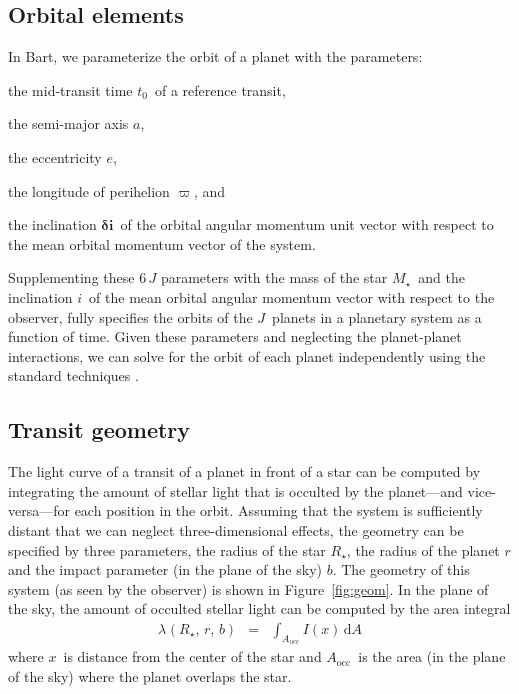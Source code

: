 \documentclass[12pt,preprint]{aastex}
\newcommand{\project}[1]{{\sffamily #1}}
\newcommand{\bart}{\project{Bart}}
\newcommand{\Fig}[1]{Figure~\ref{fig:#1}}
\newcommand{\fig}[1]{\Fig{#1}}
\newcommand{\eqlabel}[1]{\label{eq:#1}}
\newcommand{\dd}{\ensuremath{\,\mathrm{d}}}
\newcommand{\bvec}[1]{\ensuremath{\boldsymbol{#1}}}
\newcommand{\rstar}{\ensuremath{R_\star}}
\newcommand{\rplanet}{\ensuremath{r}}
\newcommand{\impactpar}{\ensuremath{b}}
\newcommand{\occbase}[2]{\ensuremath{\lambda_{#1}(#2,\,\rplanet,\,\impactpar)}}
\newcommand{\occ}[1]{\occbase{#1}{\rstar}}
\newcommand{\occultation}{\occ{}}
\newcommand{\rsurface}{\ensuremath{x}}
\newcommand{\ldp}{\ensuremath{I(\rsurface)}}
\newcommand{\occarea}{\ensuremath{A_\mathrm{occ}}}
\newcommand{\nplanets}{\ensuremath{J}}
\newcommand{\tzero}{\ensuremath{{t_0}}}
\newcommand{\smaxis}{\ensuremath{a}}
\newcommand{\ecc}{\ensuremath{e}}
\newcommand{\pomega}{\ensuremath{\varpi}}
\newcommand{\incl}{\ensuremath{\bvec{\delta i}}}
\newcommand{\mstar}{\ensuremath{M_\star}}
\newcommand{\iobs}{\ensuremath{i}}
\begin{document}
\subsection{Orbital elements}

In \bart, we parameterize the orbit of a planet with the parameters:
\begin{itemize}
    {\item the mid-transit time \tzero\ of a reference transit,}
    {\item the semi-major axis \smaxis,}
    {\item the eccentricity \ecc,}
    {\item the longitude of perihelion \pomega, and}
    {\item the inclination \incl\ of the orbital angular momentum unit
           vector with respect to the mean orbital momentum vector of the
           system.}
\end{itemize}
Supplementing these $6\,\nplanets$ parameters with the mass of the star
\mstar\ and the inclination \iobs\ of the mean orbital angular momentum vector
with respect to the observer, fully specifies the orbits of the
\nplanets\ planets in a planetary system as a function of time.
Given these parameters and neglecting the planet-planet interactions, we can
solve for the orbit of each planet independently using the standard techniques
\citep[see][for example]{goldstein}.


\subsection{Transit geometry}

The light curve of a transit of a planet in front of a star can be computed by
integrating the amount of stellar light that is occulted by the planet---and
vice-versa---for each position in the orbit.
Assuming that the system is sufficiently distant that we can neglect
three-dimensional effects, the geometry can be specified by three parameters,
the radius of the star \rstar, the radius of the planet \rplanet and the
impact parameter (in the plane of the sky) \impactpar.
The geometry of this system (as seen by the observer) is shown in \fig{geom}.
In the plane of the sky, the amount of occulted stellar light can be computed
by the area integral
\begin{eqnarray}\eqlabel{general-occ}
    \occultation & = & \int_{\occarea} \ldp \dd A
\end{eqnarray}
where \rsurface\ is distance from the center of the star and \occarea\ is
the area (in the plane of the sky) where the planet overlaps the star.
\end{document}
